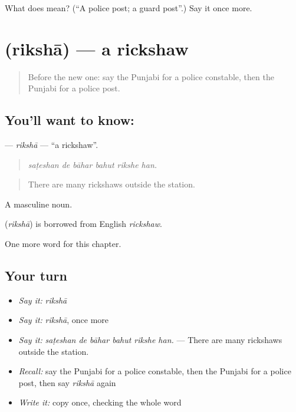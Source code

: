 \begin{tcolorbox}[breakable,colback=teal!4,colframe=teal!35!black,title={Before you move on}]
What does  mean? (\textquotedblleft{}A police post; a guard post\textquotedblright{}.) Say it once more.
\end{tcolorbox}
\section[\texorpdfstring{\pa{ਰਿਕਸ਼ਾ} (rikshā)}{ਰਿਕਸ਼ਾ (rikshā)}]{ (rikshā) — a rickshaw}

\label{lesson:PA-C272-riksha}



\begin{quote}
Before the new one: say the Punjabi for a police constable, then the Punjabi for a police post.
\end{quote}

\subsection*{You'll want to know: }
\textbf{} — \emph{rikshā} — \textquotedblleft{}a rickshaw\textquotedblright{}.

\begin{quote}
     
\end{quote}

\begin{quote}
\emph{saṭeshan de bāhar bahut rikshe han.}
\end{quote}

\begin{quote}
There are many rickshaws outside the station.
\end{quote}

A masculine noun.

\begin{cousinweb}
\textbf{} (\emph{rikshā}) is borrowed from English \emph{rickshaw}.
\end{cousinweb}

\begin{grammarlens}[title={What you've built}]
One more word for this chapter.
\end{grammarlens}

\subsection*{Your turn}
\begin{itemize}
\raggedright
  \item \emph{Say it:} \emph{rikshā}
  \item \emph{Say it:} \emph{rikshā}, once more
  \item \emph{Say it:} \emph{saṭeshan de bāhar bahut rikshe han.} — There are many rickshaws outside the station.
  \item \emph{Recall:} say the Punjabi for a police constable, then the Punjabi for a police post, then say \emph{rikshā} again
  \item \emph{Write it:} copy \textbf{} once, checking the whole word
\end{itemize}

